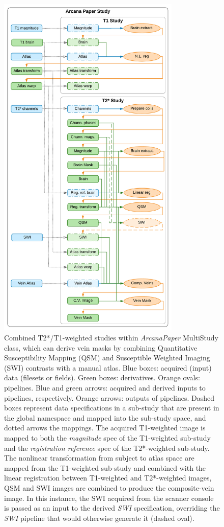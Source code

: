 \documentclass[smallextended]{svjour3}       %
\begin{document}
\begin{figure}
	\centering
    \includegraphics[width=0.775\textwidth]{../figures/t2star_t1_study}
  \caption{Combined T2*/T1-weighted studies within \emph{ArcanaPaper}
  MultiStudy class, which can derive vein masks by combining Quantitative Susceptibility
Mapping (QSM) and Susceptible Weighted Imaging (SWI) contrasts with a
manual atlas. Blue boxes: acquired (input) data (filesets or fields).
Green boxes: derivatives. Orange ovals: pipelines. Blue and green
arrows: acquired and derived inputs to pipelines, respectively. Orange
arrows: outputs of pipelines. Dashed boxes represent data specifications
in a sub-study that are present in the global namespace and mapped into
the sub-study space, and dotted arrows the mappings. The acquired
T1-weighted image is mapped to both the \emph{magnitude} spec of the
T1-weighted sub-study and the \emph{registration reference} spec of the
T2*-weighted sub-study. The nonlinear transformation from subject to
atlas space are mapped from the T1-weighted sub-study and combined with
the linear registration between T1-weighted and T2*-weighted images, QSM
and SWI images are combined to produce the composite-vein image. In this
instance, the SWI acquired from the scanner console is passed
as an input to the derived \emph{SWI} specification, overriding the
\emph{SWI} pipeline that would otherwise generate it (dashed oval).}
\label{fig:t2star_t1_study}
\end{figure} 
\end{document}

